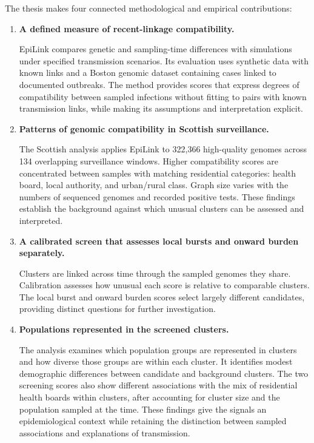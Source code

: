 The thesis makes four connected methodological and empirical contributions:

\begin{enumerate}[
    label=\textbf{\arabic*.},
    leftmargin=1.8em,
    labelsep=0.6em,
    topsep=0.5\baselineskip,
    itemsep=0.6\baselineskip,
    parsep=0.15\baselineskip,
    before=\raggedright%
]
    \item {\raggedright\bfseries A defined measure of recent-linkage compatibility.\par}\nopagebreak
    EpiLink compares genetic and sampling-time differences with simulations under specified transmission scenarios. Its evaluation uses synthetic data with known links and a Boston genomic dataset containing cases linked to documented outbreaks. The method provides scores that express degrees of compatibility between sampled infections without fitting to pairs with known transmission links, while making its assumptions and interpretation explicit.

    \item {\raggedright\bfseries Patterns of genomic compatibility in Scottish surveillance.\par}\nopagebreak
    The Scottish analysis applies EpiLink to 322,366 high-quality genomes across 134 overlapping surveillance windows. Higher compatibility scores are concentrated between samples with matching residential categories: health board, local authority, and urban/rural class. Graph size varies with the numbers of sequenced genomes and recorded positive tests. These findings establish the background against which unusual clusters can be assessed and interpreted.

    \item {\raggedright\bfseries A calibrated screen that assesses local bursts and onward burden separately.\par}\nopagebreak
    Clusters are linked across time through the sampled genomes they share. Calibration assesses how unusual each score is relative to comparable clusters. The local burst and onward burden scores select largely different candidates, providing distinct questions for further investigation.

    \item {\raggedright\bfseries Populations represented in the screened clusters.\par}\nopagebreak
    The analysis examines which population groups are represented in clusters and how diverse those groups are within each cluster. It identifies modest demographic differences between candidate and background clusters. The two screening scores also show different associations with the mix of residential health boards within clusters, after accounting for cluster size and the population sampled at the time. These findings give the signals an epidemiological context while retaining the distinction between sampled associations and explanations of transmission.
\end{enumerate}

